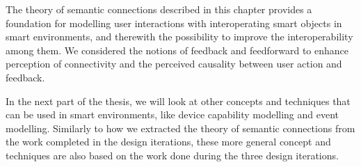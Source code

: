The theory of semantic connections described in this chapter provides a foundation for modelling user interactions with interoperating smart objects in smart environments, and therewith the possibility to improve the interoperability among them. We considered the notions of feedback and feedforward to enhance perception of connectivity and the perceived causality between user action and feedback.   

In the next part of the thesis, we will look at other concepts and techniques that can be used in smart environments, like device capability modelling and event modelling. Similarly to how we extracted the theory of semantic connections from the work completed in the design iterations, these more general concept and techniques are also based on the work done during the three design iterations.

% 






